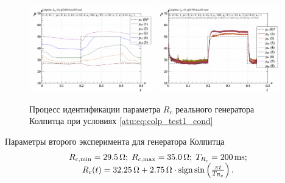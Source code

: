 \begin{figure}[htb!]
  \centerline{
    \includegraphics[width=0.48\textwidth]{p/r/colp_real_id-p_t_pi_ql3rlWvnAAW_real_d_0.png}
    \hfill
    \includegraphics[width=0.48\textwidth]{p/r/colp_real_id-p_t_p_ql3rlWvnAAW_real_d_0.png}
  }
  \caption{Процесс идентификации параметра $R_c$ реального генератора Колпитца при условиях \ref{atu:eq:colp_test1_cond} }
  \label{atu:f:colp_r_id_1}
\end{figure}


Параметры второго эксперимента для генератора Колпитца
%
\begin{equation}
  \begin{array}{c}
    R_{c,\min} = \SI{29.5}{\ohm};
    \;
    R_{c,\max} = \SI{35.0}{\ohm};
    \;
    T_{R_c} = \SI{200}{\milli\second};
  \\
    R_c(t) = \SI{32.25}{\ohm} + \SI{2.75}{\ohm} \cdot \operatorname*{sign} \sin \left( \frac{\pi t}{T_{R_c}}  \right).
  \end{array}
  \label{atu:eq:colp_test2_cond}
\end{equation}

